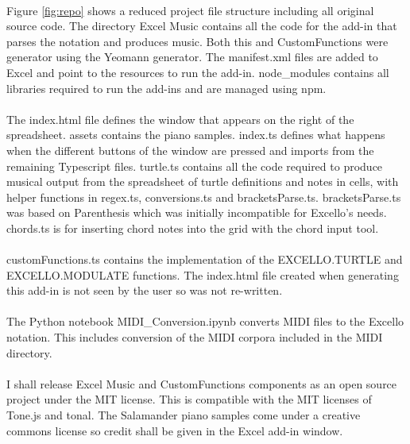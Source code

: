 \paragraph{} Figure \ref{fig:repo} shows a reduced project file structure including all original source code. The directory Excel Music contains all the code for the add-in that parses the notation and produces music. Both this and CustomFunctions were generator using the Yeomann generator. The manifest.xml files are added to Excel and point to the resources to run the add-in. node\_modules contains all libraries required to run the add-ins and are managed using npm.

\paragraph{} The index.html file defines the window that appears on the right of the spreadsheet. assets contains the piano samples. index.ts defines what happens when the different buttons of the window are pressed and imports from the remaining Typescript files. turtle.ts contains all the code required to produce musical output from the spreadsheet of turtle definitions and notes in cells, with helper functions in regex.ts, conversions.ts and bracketsParse.ts. bracketsParse.ts was based on Parenthesis which was initially incompatible for Excello's needs. chords.ts is for inserting chord notes into the grid with the chord input tool.

\paragraph{} customFunctions.ts contains the implementation of the EXCELLO.TURTLE and EXCELLO.MODULATE functions. The index.html file created when generating this add-in is not seen by the user so was not re-written.

\paragraph{} The Python notebook MIDI\_Conversion.ipynb converts MIDI files to the Excello notation. This includes conversion of the MIDI corpora included in the MIDI directory.

\paragraph{} I shall release Excel Music and CustomFunctions components as an open source project under the MIT license. This is compatible with the MIT licenses of Tone.js and tonal. The Salamander piano samples come under a creative commons license so credit shall be given in the Excel add-in window.
